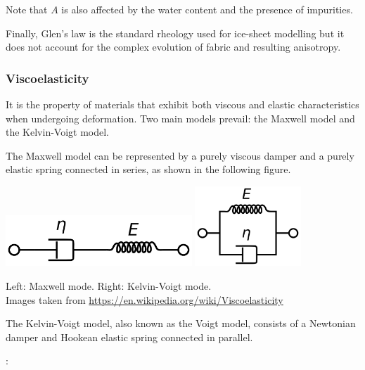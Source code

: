 Note that $A$ is also affected by the water content and the presence of impurities. 

Finally, Glen's law is the standard rheology used for ice-sheet modelling 
but it does not account for the complex evolution of fabric and resulting anisotropy.

\Literature \cite{grev97,krab16,grbl09,issg15,heah18}

\subsubsection{Viscoelasticity} 


It is the property of materials that exhibit both viscous and elastic 
characteristics when undergoing deformation.
Two main models prevail: the Maxwell model and the Kelvin-Voigt model. 

The Maxwell model can be represented by a purely viscous damper and 
a purely elastic spring connected in series, as shown in the following figure. 

\begin{center}
\includegraphics[width=7cm]{images/rheology/Maxwell_diagram}
\hspace{1cm}
\includegraphics[width=4cm]{images/rheology/Kelvin_Voigt_diagram}

{\captionfont Left: Maxwell mode. Right: Kelvin-Voigt mode.\\ 
Images taken from \url{https://en.wikipedia.org/wiki/Viscoelasticity}}
\end{center}

The Kelvin-Voigt model, also known as the Voigt model, 
consists of a Newtonian damper and Hookean elastic spring connected in parallel.

\Literature: \cite{boph12}

